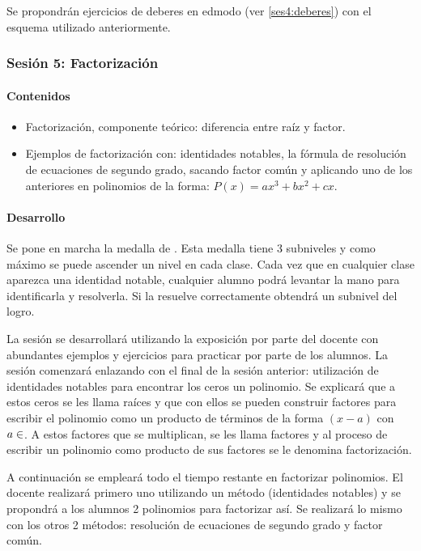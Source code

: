 Se propondrán ejercicios de deberes en edmodo (ver \ref{ses4:deberes}) con el esquema utilizado anteriormente.


\subsubsection{Sesión 5: Factorización}

\paragraph{Contenidos}
\begin{itemize}
	\item Factorización, componente teórico: diferencia entre raíz y factor.
	\item Ejemplos de factorización con:
	\subitem identidades notables,
	\subitem la fórmula de resolución de ecuaciones de segundo grado,
	\subitem sacando factor común y aplicando uno de los anteriores en polinomios de la forma: $P(x) = ax^3+bx^2+cx$.
\end{itemize}

\paragraph{Desarrollo}

Se pone en marcha la medalla de .
%
Esta medalla tiene 3 subniveles y como máximo se puede ascender un nivel en cada clase.
%
Cada vez que en cualquier clase aparezca una identidad notable, cualquier alumno podrá levantar la mano para identificarla y resolverla. 
%
Si la resuelve correctamente obtendrá un subnivel del logro.

La sesión se desarrollará utilizando la exposición por parte del docente con abundantes ejemplos y ejercicios para practicar por parte de los alumnos.
%
La sesión comenzará enlazando con el final de la sesión anterior: utilización de identidades notables para encontrar los ceros un polinomio.
%
Se explicará que a estos ceros se les llama raíces y que con ellos se pueden construir factores para escribir el polinomio como un producto de términos de la forma $(x-a)$ con $a\in\real$.
%
A estos factores que se multiplican, se les llama factores y al proceso de escribir un polinomio como producto de sus factores se le denomina factorización.

A continuación se empleará todo el tiempo restante en factorizar polinomios.
%
El docente realizará primero uno utilizando un método (identidades notables) y se propondrá a los alumnos 2 polinomios para factorizar así.
%
Se realizará lo mismo con los otros 2 métodos: resolución de ecuaciones de segundo grado y factor común.


